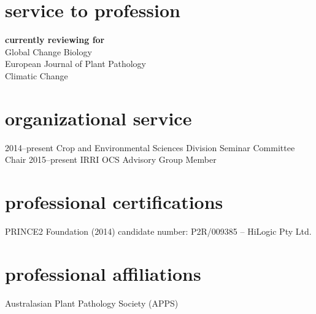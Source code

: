         \section*{service to profession}
        \textbf{currently reviewing for}\\
        Global Change Biology\\
        European Journal of Plant Pathology\\
        Climatic Change\\
        
      \section*{organizational service}
        \begin{entrylist}
          \entry
        	{2014--present}
        	{Crop and Environmental Sciences Division Seminar Committee Chair}
        	{}
        	{}
	      \entry  
	        {2015--present}
        	{IRRI OCS Advisory Group Member}
        	{}
        	{}
        \end{entrylist}
        \section*{professional certifications}
        PRINCE2 Foundation (2014) candidate number: P2R/009385 – HiLogic  Pty Ltd.
        
        \section*{professional affiliations}
        Australasian Plant Pathology Society (APPS) 

